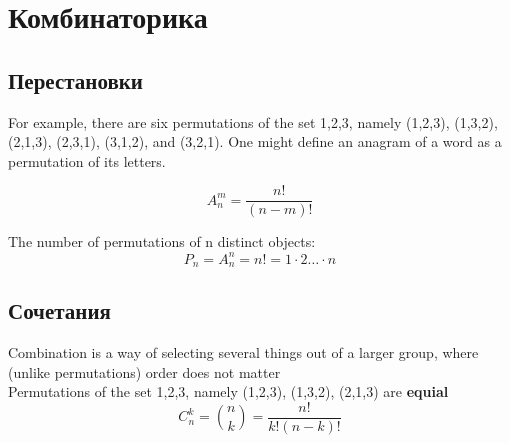 

\section{Комбинаторика}

\subsection{Перестановки}

For example, there are six permutations of the set {1,2,3}, namely (1,2,3), (1,3,2), (2,1,3), (2,3,1), (3,1,2), and (3,2,1). One might define an anagram of a word as a permutation of its letters. 

$$
A_n^m=\frac{n!}{(n-m)!} 
$$

The number of permutations of n distinct objects: \\

$$
P_n=A_n^n=n!=1\cdot2  \dots \cdot n
$$

\subsection{Сочетания}

Combination is a way of selecting several things out of a larger group, where (unlike permutations) order does not matter \\
Permutations of the set {1,2,3}, namely (1,2,3), (1,3,2), (2,1,3) are {\bfseries equial} \\

$$
C_n^k = {n\choose k} = \frac{n!}{k!\left(n-k\right)!}
$$

